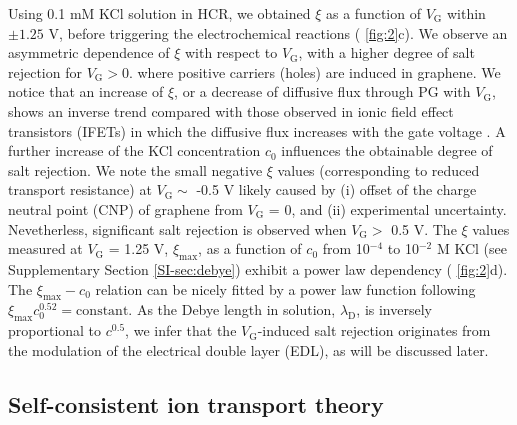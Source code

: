 Using 0.1 mM KCl solution in HCR, we obtained $\xi$ as a function of
$V_{\mathrm{G}}$ within $\pm1.25$ V, before triggering the
electrochemical reactions (\Fig{} \ref{fig:2}c). We observe an
asymmetric dependence of $\xi$ with respect to $V_{\mathrm{G}}$, with
a higher degree of salt rejection for $V_{\mathrm{G}}>0$. where
positive carriers (holes) are induced in graphene. We notice that an
increase of $\xi$, or a decrease of diffusive flux through PG with
$V_{\mathrm{G}}$, shows an inverse trend compared with those
observed in ionic field effect transistors (IFETs) in which the
diffusive flux increases with the gate voltage
\cite{Nam_2009,Cheng_2018}. A further increase of the KCl
concentration $c_{0}$ influences the obtainable degree of salt
rejection. 
{
We note the small negative $\xi$ values (corresponding to reduced transport resistance) at $V_{\mathrm{G}} \sim{}$ -0.5 V
likely caused by (i) offset of the charge neutral point (CNP) of graphene from $V_{\mathrm{G}}$ = 0, and (ii) experimental uncertainty.
Nevetherless, significant salt rejection is observed when $V_{\mathrm{G}}>$ 0.5 V.
}
The $\xi$ values measured at $V_{\mathrm{G}}$ = 1.25 V,
$\xi_{\mathrm{max}}$, as a function of $c_{0}$ from 10$^{-4}$ to
10$^{-2}$ M KCl (see Supplementary Section \ref{SI-sec:debye}) exhibit
a power law dependency (\Fig{} \ref{fig:2}d). The
$\xi_{\mathrm{max}}-c_{0}$ relation can be nicely fitted by a power
law function following
$\xi_{\mathrm{max}} c_{0}^{0.52} = \mathrm{constant}$. As the Debye
length in solution, $\lambda_{\mathrm{D}}$, is inversely proportional
to $c^{0.5}$, we infer that the $V_{\mathrm{G}}$-induced salt
rejection originates from the modulation of the electrical double
layer (EDL), as will be discussed later.

\subsection{Self-consistent ion transport theory}
\label{sec:theory}

